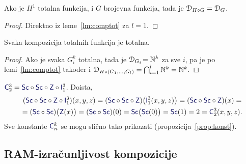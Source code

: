 \begin{korolar}[{name=[kompozicija s totalnom funkcijom slijeva ne mijenja domenu]}]\label{kor:comptot}
    Ako je $H^1$ totalna funkcija, i $G$ brojevna funkcija, tada je $\mathcal D_{H\circ G}=\mathcal D_{G}$.
\end{korolar}
\begin{proof}
    Direktno iz leme~\ref{lm:comptot} za $l=1$.
\end{proof}

\begin{propozicija}[{name=[totalnost kompozicije totalnih funkcija]}]\label{prop:comptot}
Svaka kompozicija totalnih funkcija je totalna.
\end{propozicija}
\begin{proof}
    Ako je svaka $G_i^k$ totalna, tada je $\mathcal D_{G_i}\!={\mathbb N}^k$ za sve $i$, pa je po lemi~\ref{lm:comptot} također i $\mathcal D_{H\circ(G_1,\dotsc,G_l)}=\bigcap_{i=1}^l{\mathbb N}^k={\mathbb N}^k$.
\end{proof}

\begin{primjer}[{name=[prikaz konstante kao kompozicije inicijalnih funkcija]}]\label{pr:C23}
$\f C_2^3=\f{Sc}\circ\f{Sc}\circ\f Z\circ\f I_1^3$. Doista,
\begin{multline}
(\f{Sc}\circ\f{Sc}\circ\f Z\circ\f I_1^3)(x,y,z)=(\f{Sc}\circ\f{Sc}\circ\f Z)\bigl(\f I_1^3(x,y,z)\bigr)=(\f{Sc}\circ\f{Sc}\circ\f Z)(x)=\\
=(\f{Sc}\circ\f{Sc})\bigl(\f Z(x)\bigr)=(\f{Sc}\circ\f{Sc})(0)=\f{Sc}\bigl(\f{Sc}(0)\bigr)=\f{Sc}(1)=2=\f C_2^3(x,y,z).
\end{multline}
    Sve konstante $\f C_n^k$ se mogu slično tako prikazati (propozicija~\ref{prop:konst}).
\end{primjer}

\subsection{RAM-izračunljivost kompozicije}

